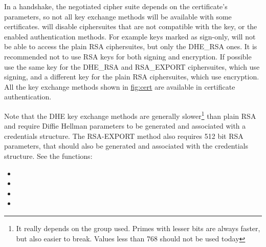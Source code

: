 \par
In a handshake, the negotiated cipher suite depends on the 
certificate's parameters, so not all key exchange methods will be available
with some certificates. \gnutls{} will disable ciphersuites that are not compatible with the key, or
the enabled authentication methods. For example keys marked as sign-only, will not be able to
access the plain RSA ciphersuites, but only the DHE\_RSA ones. It is
recommended not to use RSA keys for both signing and encryption. If possible
use the same key for the DHE\_RSA and RSA\_EXPORT ciphersuites, which use signing,
and a different key for the plain RSA ciphersuites, which use encryption.
All the key exchange methods shown in \hyperref{figure}{figure }{}{fig:cert} are
available in certificate authentication. 

Note that the DHE key exchange methods are generally slower\footnote{It really depends
on the group used. Primes with lesser bits are always faster, but also easier to break. 
Values less than 768 should not be used today} 
than plain RSA and require Diffie Hellman parameters to be generated and associated with a credentials 
structure. The RSA-EXPORT method also requires 512 bit RSA parameters, that should 
also be generated and associated with the credentials structure. See the functions:
\begin{itemize}
\item {}
\item {}
\item {}
\item {}
\end{itemize}



